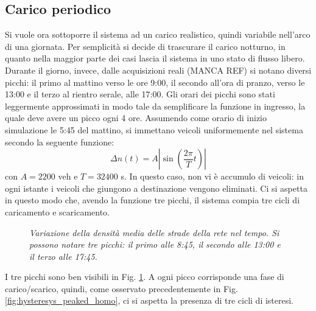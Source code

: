 \documentclass[../main.tex]{subfiles}
\begin{document}
\subsection{Carico periodico}
Si vuole ora sottoporre il sistema ad un carico realistico, quindi variabile nell'arco di una giornata.
Per semplicit\`a si decide di trascurare il carico notturno, in quanto nella maggior parte dei casi lascia il sistema in uno stato di flusso libero.
Durante il giorno, invece, dalle acquisizioni reali (MANCA REF) si notano diversi picchi: il primo al mattino verso le ore 9:00, il secondo all'ora di pranzo, verso le 13:00 e il terzo al rientro serale, alle 17:00.
Gli orari dei picchi sono stati leggermente approssimati in modo tale da semplificare la funzione in ingresso, la quale deve avere un picco ogni 4 ore.
Assumendo come orario di inizio simulazione le 5:45 del mattino, si immettano veicoli uniformemente nel sistema secondo la seguente funzione:
\begin{equation}
    \Delta n(t) = A \left\lvert \sin\left(\frac{2\pi}{T}t\right) \right\rvert 
\end{equation}
con $A = 2200$ veh e $T = 32400$ s.
In questo caso, non vi \`e accumulo di veicoli: in ogni istante i veicoli che giungono a destinazione vengono eliminati.
Ci si aspetta in questo modo che, avendo la funzione tre picchi, il sistema compia tre cicli di caricamento e scaricamento.
\begin{figure}[H]
    \centering
    \caption[Variazione periodica della densit\`a in un reticolo omogeneo]{\emph{Variazione della densit\`a media delle strade della rete nel tempo. Si possono notare tre picchi: il primo alle 8:45, il secondo alle 13:00 e il terzo alle 17:45.}}
    \label{fig:density_time_periodic_homo}
\end{figure}
I tre picchi sono ben visibili in Fig. \ref{fig:density_time_periodic_homo}.
A ogni picco corrisponde una fase di carico/scarico, quindi, come osservato precedentemente in Fig. \ref{fig:hysteresys_peaked_homo}, ci si aspetta la presenza di tre cicli di isteresi.
\end{document}
